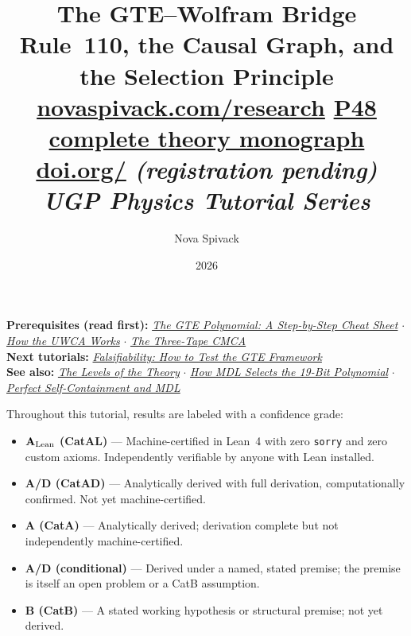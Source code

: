 \documentclass[11pt,a4paper]{article}
\date{2026}
\title{\textbf{The GTE--Wolfram Bridge}\\[6pt]
\large Rule~110, the Causal Graph, and the Selection Principle\\[8pt]
\normalsize
\href{https://novaspivack.com/research}{novaspivack.com/research}\texorpdfstring{\quad}{ }
\href{https://doi.org/10.5281/zenodo.20560550}{P48 complete theory monograph}\\[4pt]
\small\href{https://doi.org/\TutorialDOI}{doi.org/\TutorialDOI}
  \textit{(registration pending)}\\[4pt]
\normalsize\textit{UGP Physics Tutorial Series}}
\author{Nova Spivack}
\begin{document}
\setcounter{tocdepth}{2}
\maketitle
\tableofcontents
\newpage

\begin{tcolorbox}[colback=blue!6,colframe=blue!40!black,
  title=\textbf{UGP Physics Tutorial Series}]
\textbf{Prerequisites (read first):}
  \href{https://doi.org/10.5281/zenodo.20657889}%
    {\emph{The GTE Polynomial: A Step-by-Step Cheat Sheet}}
  $\cdot$
  \href{https://doi.org/10.5281/zenodo.20657919}%
    {\emph{How the UWCA Works}}
  $\cdot$
  \href{https://doi.org/10.5281/zenodo.20657906}%
    {\emph{The Three-Tape CMCA}}\\[4pt]
\textbf{Next tutorials:}
  \href{https://doi.org/10.5281/zenodo.20669142}%
    {\emph{Falsifiability: How to Test the GTE Framework}}\\[4pt]
\textbf{See also:}
  \href{https://doi.org/10.5281/zenodo.20657872}%
    {\emph{The Levels of the Theory}}
  $\cdot$
  \href{https://doi.org/10.5281/zenodo.20657876}%
    {\emph{How MDL Selects the 19-Bit Polynomial}}
  $\cdot$
  \href{https://doi.org/10.5281/zenodo.20657895}%
    {\emph{Perfect Self-Containment and MDL}}
\end{tcolorbox}

\begin{tcolorbox}[colback=boxgreen,colframe=green!50!black,
  title=\textbf{Claim-Strength Taxonomy}]
Throughout this tutorial, results are labeled with a confidence grade:
\begin{itemize}[itemsep=2pt]
  \item \textbf{$\mathbf{A}_{\rm Lean}$ (CatAL)} --- Machine-certified in Lean~4 with zero \texttt{sorry} and zero custom axioms.  Independently verifiable by anyone with Lean installed.
  \item \textbf{A/D (CatAD)} --- Analytically derived with full derivation, computationally confirmed.  Not yet machine-certified.
  \item \textbf{A (CatA)} --- Analytically derived; derivation complete but not independently machine-certified.
  \item \textbf{A/D (conditional)} --- Derived under a named, stated premise; the premise is itself an open problem or a CatB assumption.
  \item \textbf{B (CatB)} --- A stated working hypothesis or structural premise; not yet derived.
\end{itemize}
\end{tcolorbox}
\end{document}
